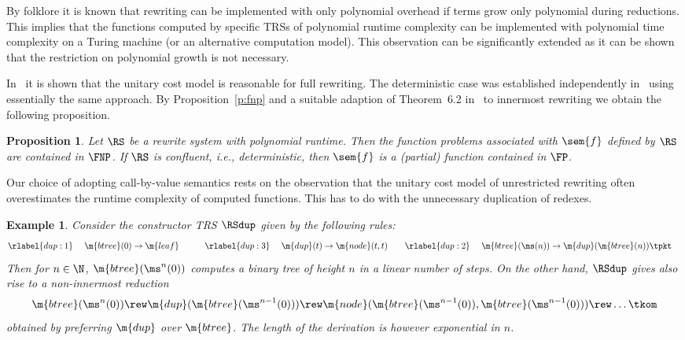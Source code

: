 \documentclass{LMCS}
\newtheorem{example}[thm]{Example}
\newtheorem{proposition}[thm]{Proposition}
\begin{document}
By folklore it is known that rewriting can be implemented with only polynomial overhead
if terms grow only polynomial during reductions. This implies that the functions 
computed by specific TRSs of polynomial runtime complexity can be implemented
with polynomial time complexity on a Turing machine (or an alternative computation
model). This observation can be significantly extended as it can be shown that 
the restriction on polynomial growth is not necessary. 

In~\cite{AM10,AM10b} it is shown that the unitary cost model is reasonable 
for full rewriting. The deterministic case was established independently in~\cite{LM09,LM:2009b} using essentially the same approach.
By Proposition~\ref{p:fnp} and a suitable adaption of Theorem~6.2 in~\cite{AM10b} to innermost rewriting we obtain the following proposition.

\begin{proposition}
\label{p:invariance}
Let $\RS$ be a rewrite system with polynomial runtime.
Then the function problems associated with $\sem{f}$ defined by $\RS$ are contained in $\FNP$. 
If $\RS$ is confluent, i.e., deterministic, then $\sem{f}$ is a (partial) function contained in $\FP$.
\end{proposition}

Our choice of adopting call-by-value semantics rests
on the observation that the unitary cost model of unrestricted rewriting 
often overestimates the runtime complexity of computed functions. 
This has to do with the unnecessary duplication of redexes.
\begin{example}\label{ex:dup}
  Consider the constructor TRS $\RSdup$ given by the following rules:
  \begin{alignat*}{6}
    \rlabel{dup:1} &~& \m{btree}(0) & \to \m{leaf}  
    \qquad & 
    \rlabel{dup:3} &~& \m{dup}(t) & \to \m{node}(t,t)
    \quad &
    \rlabel{dup:2} &~& \m{btree}(\ms(n)) & \to \m{dup}(\m{btree}(n)) \tpkt 
  \end{alignat*}
Then for $n \in \N$, $\m{btree}(\ms^n(0))$ computes a binary tree of height $n$
  in a linear number of steps.
  On the other hand, $\RSdup$ gives also rise to a non-innermost reduction
  $$
  \m{btree}(\ms^{n}(0)) 
  \rew \m{dup}(\m{btree}(\ms^{n-1}(0)))
  \rew \m{node}(\m{btree}(\ms^{n-1}(0)), \m{btree}(\ms^{n-1}(0)))
  \rew \dots
  \tkom
  $$
  obtained by preferring $\m{dup}$ over $\m{btree}$.
  The length of the derivation is however exponential in $n$.
\end{example}
\end{document}
